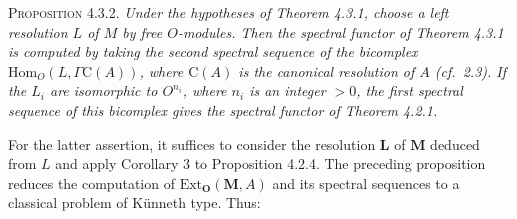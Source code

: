 \textsc{Proposition 4.3.2.} \textit{Under the hypotheses of Theorem
\textup{4.3.1}, choose a left resolution $L$ of $M$ by free $O$-modules. Then the
spectral functor of Theorem \textup{4.3.1} is computed by taking the second spectral
sequence of the bicomplex $\mathrm{Hom}_O(L,\Gamma \mathrm C(A))$, where $\mathrm C(A)$ is
the canonical resolution of $A$ \textup{(}cf.\ \textup{2.3)}. If the $L_i$ are isomorphic to
$O^{n_i}$, where $n_i$ is an integer $>0$, the first spectral sequence of this
bicomplex gives the spectral functor of Theorem \textup{4.2.1}.}

For the latter assertion, it suffices to consider the resolution $\mathbf L$
of $\mathbf M$ deduced from $L$ and apply Corollary 3 to Proposition 4.2.4.
The preceding proposition reduces the computation of
$\mathrm{Ext}_{\mathbf O}(\mathbf M,A)$ and its spectral sequences to a
classical problem of Künneth type. Thus:

